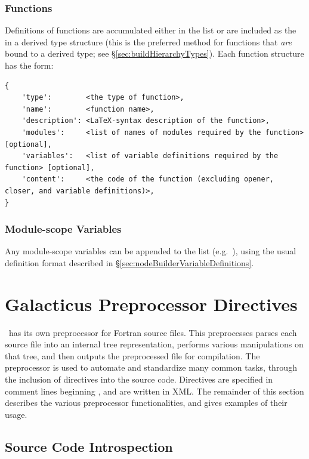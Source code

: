 \subsubsection{Functions}\label{sec:buildHierarchyFunctions}

Definitions of functions are accumulated either in the list  or are included as the  in a derived type structure (this is the preferred method for functions that \emph{are} bound to a derived type; see \S\ref{sec:buildHierarchyTypes}). Each function structure has the form:
\begin{verbatim}
{
    'type':        <the type of function>,
    'name':        <function name>,
    'description': <LaTeX-syntax description of the function>,
    'modules':     <list of names of modules required by the function> [optional],
    'variables':   <list of variable definitions required by the function> [optional],
    'content':     <the code of the function (excluding opener, closer, and variable definitions)>,
}
\end{verbatim}

\subsubsection{Module-scope Variables}

Any module-scope variables can be appended to the list  (e.g.\ ), using the usual definition format described in \S\ref{sec:nodeBuilderVariableDefinitions}.

\section{Galacticus Preprocessor Directives}\label{sec:sourceTreePreprocessor}

\glc\ has its own preprocessor for Fortran source files. This preprocesses parses each source file into an internal tree representation, performs various manipulations on that tree, and then outputs the preprocessed file for compilation. The preprocessor is used to automate and standardize many common tasks, through the inclusion of directives into the source code. Directives are specified in comment lines beginning \mono{!\#}, and are written in XML. The remainder of this section describes the various preprocessor functionalities, and gives examples of their usage.

\subsection{Source Code Introspection}

